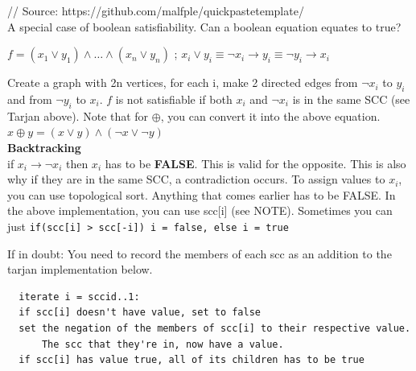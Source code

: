 \begin{large}

// Source: https://github.com/malfple/quickpastetemplate/ \\
A special case of boolean satisfiability. Can a boolean equation equates to true?

$f = \left(x_1 \lor y_1 \right) \land \dots \land \left(x_n \lor y_n \right)$ ; $x_i \lor y_i \equiv \neg x_i \to y_i \equiv \neg y_i \to x_i$

Create a graph with 2n vertices, for each i, make 2 directed edges from $\neg x_i$ to $y_i$ and from $\neg y_i$ to $x_i$. $f$ is not satisfiable if both $x_i$ and $\neg x_i$ is in the same SCC (see Tarjan above). Note that for $\oplus$, you can convert it into the above equation. $x \oplus y = \left(x \lor y \right) \land \left( \neg x \lor \neg y \right)$ \\

\textbf{Backtracking} \\
if $x_i \to \neg x_i$ then $x_i$ has to be \textbf{FALSE}. This is valid for the opposite. This is also why if they are in the same SCC, a contradiction occurs. To assign values to $x_i$, you can use topological sort. Anything that comes earlier has to be FALSE. In the above implementation, you can use scc[i] (see NOTE). Sometimes you can just \texttt{if(scc[i] > scc[-i]) i = false, else i = true}

If in doubt: You need to record the members of each scc as an addition to the tarjan implementation below.
\begin{lstlisting}
  iterate i = sccid..1:
  if scc[i] doesn't have value, set to false
  set the negation of the members of scc[i] to their respective value.
      The scc that they're in, now have a value.
  if scc[i] has value true, all of its children has to be true
\end{lstlisting}

\end{large}
